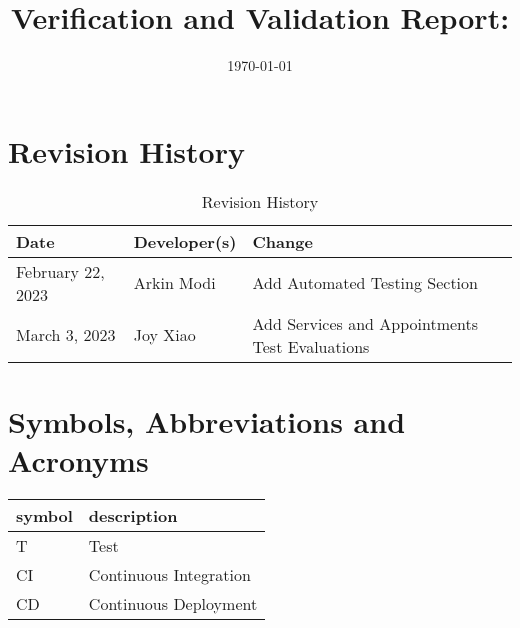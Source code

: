 \documentclass[12pt, titlepage]{article}
\begin{document}
\title{Verification and Validation Report: \progname}
\author{\authname}
\date{\today}

\maketitle


\section{Revision History}

\begin{table}[hp]
	\caption{Revision History} \label{TblRevisionHistory}
	\begin{tabularx}{\textwidth}{llX}
		\toprule
		\textbf{Date}     & \textbf{Developer(s)} & \textbf{Change}                                \\
		\midrule
		February 22, 2023 & Arkin Modi            & Add Automated Testing Section                  \\
		March 3, 2023     & Joy Xiao              & Add Services and Appointments Test Evaluations \\
		\bottomrule
	\end{tabularx}
\end{table}
\newpage

\section{Symbols, Abbreviations and Acronyms}

\renewcommand{\arraystretch}{1.2}
\begin{tabular}{l l}
	\toprule
	\textbf{symbol} & \textbf{description}   \\
	\midrule
	T               & Test                   \\
	CI              & Continuous Integration \\
	CD              & Continuous Deployment  \\
	\bottomrule
\end{tabular}\\

\newpage

\tableofcontents

\listoftables %

\listoffigures %

\newpage

\end{document}
